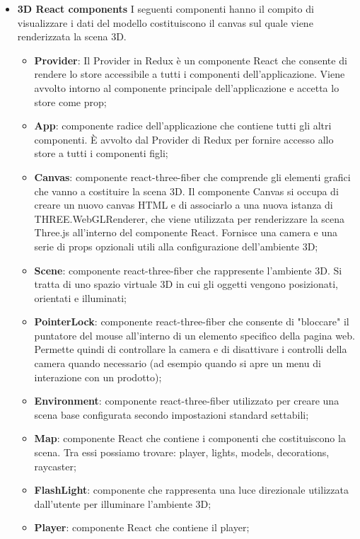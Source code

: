 \begin{itemize}
\begin{itemize}
		\end{itemize}
		\item \textbf{\large 3D React components}
		I seguenti componenti hanno il compito di visualizzare i dati del modello costituiscono il canvas 
		sul quale viene renderizzata la scena 3D.
		\begin{itemize}
			\item \textbf{Provider}: Il Provider in Redux è un componente React che consente di rendere lo store accessibile
			a tutti i componenti dell'applicazione. 
			Viene avvolto intorno al componente principale dell'applicazione e accetta lo store come prop; 
			\item \textbf{App}: componente radice dell'applicazione che contiene tutti gli altri componenti. 
			È avvolto dal Provider di Redux per fornire accesso allo store a tutti i componenti figli;
			\item \textbf{Canvas}: componente react-three-fiber che comprende gli elementi grafici che vanno a costituire
			la scena 3D.
			Il componente Canvas si occupa di creare un nuovo canvas HTML e di associarlo a una nuova istanza di THREE.WebGLRenderer, 
			che viene utilizzata per renderizzare la scena Three.js all'interno del componente React.
			Fornisce una camera e una serie di props opzionali utili alla configurazione dell'ambiente 3D;
			\item \textbf{Scene}: componente react-three-fiber che rappresente l'ambiente 3D.
			Si tratta di uno spazio virtuale 3D in cui gli oggetti vengono posizionati, orientati e illuminati; 
			\item \textbf{PointerLock}: componente react-three-fiber che consente di "bloccare" il puntatore del mouse all'interno 
			di un elemento specifico della pagina web.
			Permette quindi di controllare la camera e di disattivare i controlli della camera quando 
			necessario (ad esempio quando si apre un menu di interazione con un prodotto);
			\item \textbf{Environment}: componente react-three-fiber utilizzato per creare una scena base configurata
			secondo impostazioni standard settabili;
			\item \textbf{Map}: componente React che contiene i componenti che costituiscono la scena.
			Tra essi possiamo trovare: player, lights, models, decorations, raycaster;
			\item \textbf{FlashLight}: componente che rappresenta una luce direzionale utilizzata dall'utente per illuminare
			l'ambiente 3D;
			\item \textbf{Player}: componente React che contiene il player;

\end{itemize}
\end{itemize}

